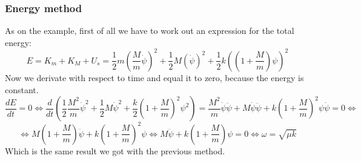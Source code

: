 \documentclass{report}
\begin{document}
\subsubsection*{Energy method}
  \noindent As on the example, first of all we have to work out an expression for the total energy:
  \[E=K_m+K_M+U_s=\dfrac12 m\left(\dfrac{M}{m}\dot{\psi}\right)^2 + \dfrac12 M(\dot{\psi})^2 + \dfrac12 k \left(\left(1+\dfrac{M}{m}\right)\psi\right)^2\]
  \noindent Now we derivate with respect to time and equal it to zero, because the energy is constant.
  \[\dfrac{dE}{dt}=0\Longleftrightarrow \dfrac{d}{dt}\left(\dfrac12 \dfrac{M^2}{m}\dot{\psi}^2+\dfrac12 M\dot{\psi}^2+\dfrac{k}{2}\left(1+\dfrac{M}{m}\right)^2\psi^2\right)=\dfrac{M^2}{m}\dot{\psi}\ddot{\psi}+M\dot{\psi}\ddot{\psi}+k\left(1+\dfrac{M}{m}\right)^2\psi\dot{\psi}=0\Longleftrightarrow\]
  \[\Longleftrightarrow M\left(1+\dfrac{M}{m}\right)\ddot{\psi}+k\left(1+\dfrac{M}{m}\right)^2\psi\Longleftrightarrow \boxed{M\ddot{\psi}+k\left(1+\dfrac{M}{m}\right)\psi=0} \Longleftrightarrow \boxed{\omega=\sqrt{\mu k}}\]
  \noindent Which is the same result we got with the previous method.
\end{document}
